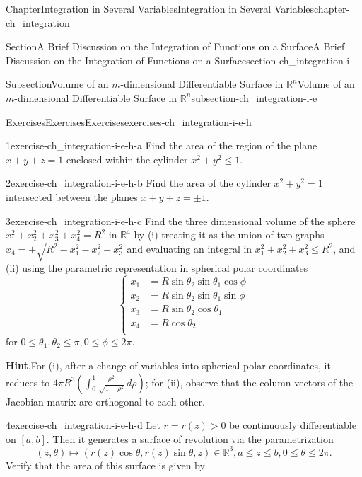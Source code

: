 \documentclass[oneside,10pt,]{book}
\newcommand{\blocktitlefont}{\relax}
\numberwithin{equation}{section}
\newcommand{\bbR}{\mathbb{R}}
\newcommand{\amp}{&}
\begin{document}
\begin{chapterptx}{Chapter}{Integration in Several Variables}{}{Integration in Several Variables}{}{}{chapter-ch_integration}
\begin{sectionptx}{Section}{A Brief Discussion on the Integration of Functions on a Surface}{}{A Brief Discussion on the Integration of Functions on a Surface}{}{}{section-ch_integration-i}
\begin{subsectionptx}{Subsection}{Volume of an \(m\)-dimensional Differentiable Surface in \(\bbR^{n}\)}{}{Volume of an \(m\)-dimensional Differentiable Surface in \(\bbR^{n}\)}{}{}{subsection-ch_integration-i-e}
\begin{exercises-subsubsection-numberless}{Exercises}{Exercises}{}{Exercises}{}{}{exercises-ch_integration-i-e-h}
\begin{divisionexercise}{1}{}{}{exercise-ch_integration-i-e-h-a}%
Find the area of the region of the plane \(x+y+z=1\) enclosed within the cylinder \(x^2+y^2 \le 1\).%
\end{divisionexercise}%
\begin{divisionexercise}{2}{}{}{exercise-ch_integration-i-e-h-b}%
Find the area of the cylinder \(x^{2} +y^{2}=1\) intersected between the planes \(x+y+z=\pm 1\).%
\end{divisionexercise}%
\begin{divisionexercise}{3}{}{}{exercise-ch_integration-i-e-h-c}%
Find the three dimensional volume of the sphere \(x_{1}^{2}+x_{2}^{2}+x_{3}^{2}+x_{4}^{2}=R^{2}\) in \(\bbR^{4}\) by (i) treating it as the union of two graphs \(x_{4}=\pm \sqrt{R^{2}-x_{1}^{2}-x_{2}^{2}-x_{3}^{2}}\) and evaluating an integral in \(x_{1}^{2}+x_{2}^{2}+x_{3}^{2}\le R^{2}\), and (ii) using the parametric representation in spherical polar coordinates%
\begin{equation*}
\begin{cases} x_{1} \amp = R\sin\theta_{2}\sin\theta_{1}\cos\phi \\
x_{2} \amp = R\sin\theta_{2}\sin\theta_{1}\sin\phi \\
x_{3} \amp = R\sin\theta_{2}\cos\theta_{1} \\
x_{4} \amp = R\cos\theta_{2}\\
\end{cases}
\end{equation*}
for \(0\le \theta_{1}, \theta_{2}\le \pi, 0\le \phi \le 2\pi\).%
\par\smallskip%
\noindent\textbf{\blocktitlefont Hint}.\hypertarget{hint-ch_integration-i-e-h-c-b}{}\quad{}For (i), after a change of variables into spherical polar coordinates, it reduces to \(4\pi R^{3} \left( \int_{0}^{1}\frac{\rho^{2}}{\sqrt{1-\rho^{2}}}\, d\rho \right)\);  for (ii), observe that the column vectors of the Jacobian matrix are orthogonal to each other.\end{divisionexercise}%
\begin{divisionexercise}{4}{}{}{exercise-ch_integration-i-e-h-d}%
Let \(r=r(z) >0\) be continuously differentiable on \([a, b]\). Then it generates a surface of revolution via the parametrization%
\begin{equation*}
(z, \theta)\mapsto (r(z)\cos\theta, r(z)\sin\theta, z) \in \bbR^{3}, a\le z \le b, 0\le \theta \le 2\pi.
\end{equation*}
Verify that the area of this surface is given by%

\end{divisionexercise}
\end{exercises-subsubsection-numberless}
\end{subsectionptx}
\end{sectionptx}
\end{chapterptx}
\end{document}
